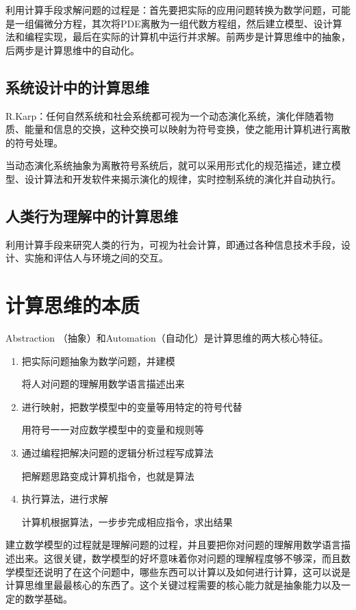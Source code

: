 利用计算手段求解问题的过程是：首先要把实际的应用问题转换为数学问题，可能是一组偏微分方程，其次将PDE离散为一组代数方程组，然后建立模型、设计算法和编程实现，最后在实际的计算机中运行并求解。前两步是计算思维中的抽象，后两步是计算思维中的自动化。

\subsection{系统设计中的计算思维}

R.Karp：任何自然系统和社会系统都可视为一个动态演化系统，演化伴随着物质、能量和信息的交换，这种交换可以映射为符号变换，使之能用计算机进行离散的符号处理。

当动态演化系统抽象为离散符号系统后，就可以采用形式化的规范描述，建立模型、设计算法和开发软件来揭示演化的规律，实时控制系统的演化并自动执行。

\subsection{人类行为理解中的计算思维}

利用计算手段来研究人类的行为，可视为社会计算，即通过各种信息技术手段，设计、实施和评估人与环境之间的交互。

\section{计算思维的本质}

Abstraction （抽象）和Automation（自动化）是计算思维的两大核心特征。

\begin{enumerate}
    \item 把实际问题抽象为数学问题，并建模
    
    将人对问题的理解用数学语言描述出来
    \item 进行映射，把数学模型中的变量等用特定的符号代替
    
    用符号一一对应数学模型中的变量和规则等
    \item 通过编程把解决问题的逻辑分析过程写成算法
    
    把解题思路变成计算机指令，也就是算法
    \item 执行算法，进行求解
    
    计算机根据算法，一步步完成相应指令，求出结果
\end{enumerate}

建立数学模型的过程就是理解问题的过程，并且要把你对问题的理解用数学语言描述出来。这很关键，数学模型的好坏意味着你对问题的理解程度够不够深，而且数学模型还说明了在这个问题中，哪些东西可以计算以及如何进行计算，这可以说是计算思维里最最核心的东西了。这个关键过程需要的核心能力就是抽象能力以及一定的数学基础。

